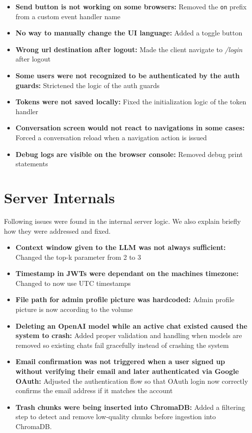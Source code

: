 \begin{itemize}
    \item \textbf{Send button is not working on some browsers:} Removed the \texttt{on} prefix from a custom event handler name
    \item \textbf{No way to manually change the UI language:} Added a toggle button
    \item \textbf{Wrong url destination after logout:} Made the client navigate to \textit{/login} after logout
    \item \textbf{Some users were not recognized to be authenticated by the auth guards:} Strictened the logic of the auth guards
    \item \textbf{Tokens were not saved locally:} Fixed the initialization logic of the token handler
    \item \textbf{Conversation screen would not react to navigations in some cases:} Forced a conversation reload when a navigation action is issued
    \item \textbf{Debug logs are visible on the browser console:} Removed debug print statements
\end{itemize}

\section{Server Internals}
Following issues were found in the internal server logic.
We also explain briefly how they were addressed and fixed.

\begin{itemize}
    \item \textbf{Context window given to the LLM was not always sufficient:} Changed the top-k parameter from 2 to 3
    \item \textbf{Timestamp in JWTs were dependant on the machines timezone:} Changed to now use UTC timestamps
    \item \textbf{File path for admin profile picture was hardcoded:} Admin profile picture is now according to the volume
     \item \textbf{Deleting an OpenAI model while an active chat existed caused the system to crash:} Added proper validation and handling when models are removed so existing chats fail gracefully instead of crashing the system
    \item \textbf{Email confirmation was not triggered when a user signed up without verifying their email and later authenticated via Google OAuth:} Adjusted the authentication flow so that OAuth login now correctly confirms the email address if it matches the account
    \item \textbf{Trash chunks were being inserted into ChromaDB:} Added a filtering step to detect and remove low-quality chunks before ingestion into ChromaDB.
\end{itemize}